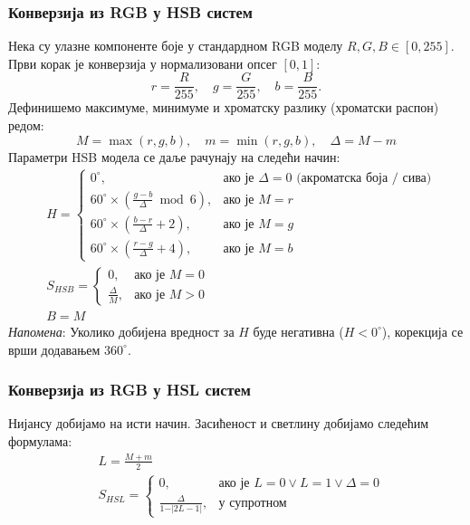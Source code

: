 \documentclass[A4, 11pt]{article}
\begin{document}
\subsubsection*{Конверзија из RGB у HSB систем}
Нека су улазне компоненте боје у стандардном RGB моделу  $R, G, B \in [0, 255]$. Први корак је конверзија у нормализовани опсег $[0, 1]$:$$r = \frac{R}{255}, \quad g = \frac{G}{255}, \quad b = \frac{B}{255}.$$ Дефинишемо максимуме, минимуме и хроматску разлику (хроматски распон) редом: $$M = \max(r, g, b), \quad m = \min(r, g, b), \quad \Delta = M - m$$
Параметри HSB модела се даље рачунају на следећи начин:
\begin{align}
    &H = \begin{cases}  0^\circ, & \text{ако је } \Delta = 0 \text{ (акроматска боја / сива)} \\ 60^\circ \times \left( \frac{g - b}{\Delta} \bmod 6 \right), & \text{ако је } M = r \\ 60^\circ \times \left( \frac{b - r}{\Delta} + 2 \right), & \text{ако је } M = g \\ 60^\circ \times \left( \frac{r - g}{\Delta} + 4 \right), & \text{ако је } M = b  \end{cases} \nonumber \\
    &S_{HSB} = \begin{cases}    0, & \text{ако је } M = 0 \\   \frac{\Delta}{M}, & \text{ако је } M > 0    \end{cases} \nonumber \\
    &B = M \nonumber
\end{align} 
\noindent *\textit{Напомена}: Уколико добијена вредност за $H$ буде негативна ($H < 0^\circ$), корекција се врши додавањем $360^\circ$.\\
\subsubsection*{Конверзија из RGB у HSL систем}
Нијансу добијамо на исти начин. Засићеност и светлину добијамо следећим формулама:
\begin{align}
 &L = \frac{M + m}{2} \nonumber \\
 &S_{HSL} = \begin{cases}    0, & \text{ако је } L = 0 \lor L = 1 \lor \Delta = 0 \\   \frac{\Delta}{1 - \vert{}2L - 1\vert{}}, & \text{у супротном}   \end{cases} \nonumber 
\end{align}
\end{document}
